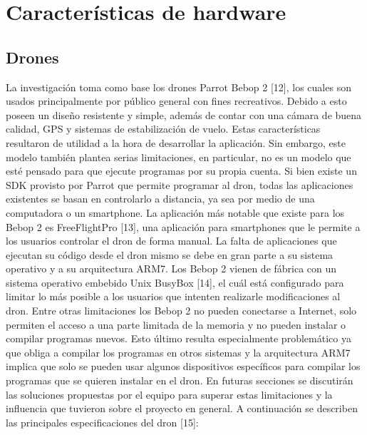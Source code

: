 \chapter{Características de hardware}


\section {Drones}
La investigación toma como base los drones Parrot Bebop 2 [12], los cuales son usados principalmente por público general con fines recreativos. Debido a esto poseen un diseño resistente y simple, además de contar con una cámara de buena calidad, GPS y sistemas de estabilización de vuelo. Estas características resultaron de utilidad a la hora de desarrollar la aplicación.
Sin embargo, este modelo también plantea serias limitaciones, en particular, no es un modelo que esté pensado para que ejecute programas por su propia cuenta. Si bien existe un SDK provisto por Parrot que permite programar al dron, todas las aplicaciones existentes se basan en controlarlo a distancia, ya sea por medio de una computadora o un smartphone. La aplicación más notable que existe para los Bebop 2 es FreeFlightPro [13], una aplicación para smartphones que le permite a los usuarios controlar el dron de forma manual. La falta de aplicaciones que ejecutan su código desde el dron mismo se debe en gran parte a su sistema operativo y a su arquitectura ARM7. Los Bebop 2 vienen de fábrica con un sistema operativo embebido Unix BusyBox [14], el cuál está configurado para limitar lo más posible a los usuarios que intenten realizarle modificaciones al dron. Entre otras limitaciones los Bebop 2 no pueden conectarse a Internet, solo permiten el acceso a una parte limitada de la memoria y no pueden instalar o compilar programas nuevos. Esto último resulta especialmente problemático ya que obliga a compilar los programas en otros sistemas y la arquitectura ARM7 implica que solo se pueden usar algunos dispositivos específicos para compilar los programas que se quieren instalar en el dron. En futuras secciones se discutirán las soluciones propuestas por el equipo para superar estas limitaciones y la influencia que tuvieron sobre el proyecto en general.
A continuación se describen las principales especificaciones del dron [15]:

